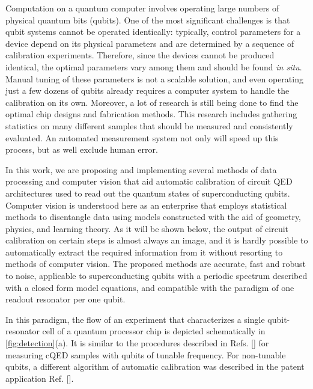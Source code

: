\documentclass[%
 aip,
 draft,
 amsmath,amssymb,
 reprint,%
]{revtex4-1}
\begin{document}
Computation on a quantum computer involves operating large numbers of physical quantum bits (qubits). One of the most significant challenges is that qubit systems cannot be operated identically:\cite{kelly2018, chen2018} typically, control parameters for a device depend on its physical parameters and are determined by a sequence of calibration experiments. Therefore, since the devices cannot be produced identical, the optimal parameters vary among them and should be found \textit{in situ}. Manual tuning of these parameters is not a scalable solution, and even operating just a few dozens of qubits already requires a computer system to handle the calibration on its own. Moreover, a lot of research is still being done to find the optimal chip designs and fabrication methods. This research includes gathering statistics on many different samples that should be measured and consistently evaluated. An automated measurement system not only will speed up this process, but as well exclude human error.

In this work, we are proposing and implementing several methods of data processing and computer vision that aid automatic calibration of circuit QED\cite{blais2007} architectures used to read out the quantum states of superconducting qubits. Computer vision is understood here as an enterprise that employs statistical methods to disentangle data using models constructed with the aid of geometry, physics, and learning theory.\cite{forsyth2011} As it will be shown below, the output of circuit calibration on certain steps is almost always an image, and it is hardly possible to automatically extract the required information from it without resorting to methods of computer vision. The proposed methods are accurate, fast and robust to noise, applicable to superconducting qubits with a periodic spectrum described with a closed form model equations, and compatible with the paradigm of one readout resonator per one qubit.\cite{versluis2017, kelly2015}

In this paradigm, the flow of an experiment that characterizes a single qubit-resonator cell of a quantum processor chip is depicted schematically in \autoref{fig:detection}(a). It is similar to the  procedures described in Refs. [] for measuring cQED samples with qubits of tunable frequency. For non-tunable qubits, a different algorithm of automatic calibration was described in the patent application Ref. []. 
\end{document}
